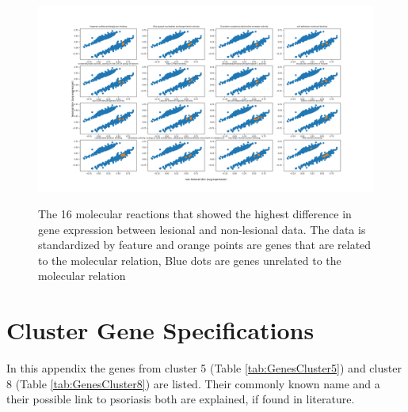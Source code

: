 \documentclass[10pt,a4paper]{article}
\begin{document}
	\begin{figure}[H]
		\includegraphics[width=1\textwidth]{Sign_Molecular_Psoriasis_Scaled.png}
		\label{fig:MolecularScaledByFeature1}
		\caption{The 16 molecular reactions that showed the highest difference in gene expression between lesional and non-lesional data. The data is standardized by feature and orange points are genes that are related to the molecular relation, Blue dots are genes unrelated to the molecular relation}
	\end{figure}

	\section{Cluster Gene Specifications}
	\label{app:ClusterGeneSpecifications}

In this appendix the genes from cluster 5 (Table \ref{tab:GenesCluster5}) and cluster 8 (Table \ref{tab:GenesCluster8}) are listed. Their commonly known name and a their possible link to psoriasis both are explained, if found in literature.
\end{document}
